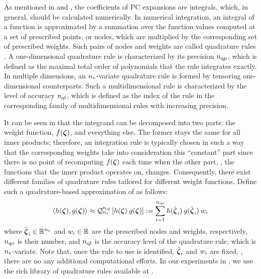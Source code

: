 
As mentioned in  and , the coefficients of PC expansions are integrals, which, in general, should be calculated numerically.
In numerical integration, an integral of a function is approximated by a summation over the function values computed at a set of prescribed points, or nodes, which are multiplied by the corresponding set of prescribed weights.
Such pairs of nodes and weights are called quadrature rules \cite{press2007}.
A one-dimensional quadrature rule is characterized by its precision ${n_\text{qp}}$, which is defined as the maximal total order \cite{heiss2008} of polynomials that the rule integrates exactly.
In multiple dimensions, an ${n_\text{v}}$-variate quadrature rule is formed by tensoring one-dimensional counterparts. Such a multidimensional rule is characterized by the level of accuracy ${n_\text{ql}}$, which is defined as the index of the rule in the corresponding family of multidimensional rules with increasing precision.

It can be seen in  that the integrand can be decomposed into two parts: the weight function, $f(\boldsymbol{\zeta})$, and everything else.
The former stays the same for all inner products; therefore, an integration rule is typically chosen in such a way that the corresponding weights take into consideration this ``constant'' part since there is no point of recomputing $f(\boldsymbol{\zeta})$ each time when the other part, \ie, the functions that the inner product operates on, changes.
Consequently, there exist different families of quadrature rules tailored for different weight functions.
Define such a quadrature-based approximation of  as follows:
\[
  \oInner{h(\vz)}{g(\vz)} \approx \oQuad{\nvars}{\qdlevel}{h(\vz) \: g(\vz)} := \sum_{i = 1}^{\qdorder} h(\qdn{\vz}_i) \: g(\qdn{\vz}_i) \: \qdw_i
\]
where $\hat{\boldsymbol{\zeta}}_i \in \mathbb{R}^{n_\text{v}}$ and $w_i \in \mathbb{R}$ are the prescribed nodes and weights, respectively, ${n_\text{qo}}$ is their number, and ${n_\text{ql}}$ is the accuracy level of the quadrature rule, which is ${n_\text{v}}$-variate.
Note that, once the rule to use is identified, $\hat{\boldsymbol{\zeta}}_i$ and $w_i$ are fixed, \ie, there are no any additional computational efforts.
In our experiments in , we use the rich library of quadrature rules available at \cite{burkardt2013}.

